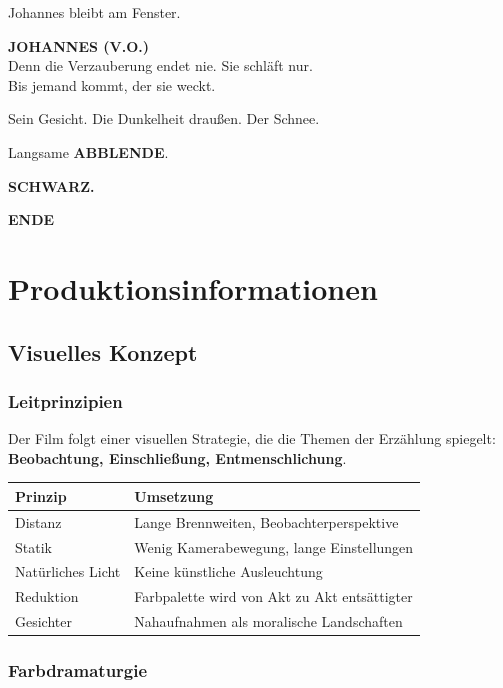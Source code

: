 \documentclass[11pt,a4paper,twoside]{book}
\newcommand{\voiceover}[1]{%
    \begin{voiceoverbox}
    \textbf{JOHANNES (V.O.)}\\
    #1
    \end{voiceoverbox}
}
\begin{document}
Johannes bleibt am Fenster.

\voiceover{Denn die Verzauberung endet nie. Sie schläft nur.\\[0.5em]
Bis jemand kommt, der sie weckt.}

Sein Gesicht. Die Dunkelheit draußen. Der Schnee.

Langsame \textbf{ABBLENDE}.

\textbf{SCHWARZ.}

\begin{center}
\vspace{2em}
{\Large\textbf{ENDE}}
\vspace{2em}
\end{center}


\part{Produktionsinformationen}

\chapter{Visuelles Konzept}

\section{Leitprinzipien}

Der Film folgt einer visuellen Strategie, die die Themen der Erzählung spiegelt: \textbf{Beobachtung, Einschließung, Entmenschlichung}.

\begin{tabularx}{\textwidth}{lX}
\toprule
\textbf{Prinzip} & \textbf{Umsetzung} \\
\midrule
Distanz & Lange Brennweiten, Beobachterperspektive \\
Statik & Wenig Kamerabewegung, lange Einstellungen \\
Natürliches Licht & Keine künstliche Ausleuchtung \\
Reduktion & Farbpalette wird von Akt zu Akt entsättigter \\
Gesichter & Nahaufnahmen als moralische Landschaften \\
\bottomrule
\end{tabularx}

\section{Farbdramaturgie}
\end{document}
